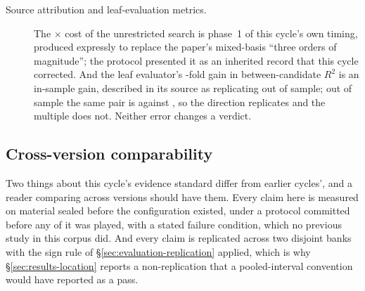\begin{description}
\item[Source attribution and leaf-evaluation metrics.] The
  \vsevenPhaseOneCost$\times$ cost of the unrestricted search is phase~1 of this cycle's own timing,
  produced expressly to replace the \vsix{} paper's mixed-basis ``three orders of magnitude''; the
  protocol presented it as an inherited record that this cycle corrected. And the leaf evaluator's \vsevenKoneFold-fold gain in between-candidate
  $R^2$ is an in-sample gain, described in its source as replicating out of sample; out of sample the
  same pair is \vsevenKoneRsqOosBefore{} against \vsevenKoneRsqOosAfter{}, so the direction
  replicates and the multiple does not. Neither error changes a verdict.

\end{description}

\subsection{Cross-version comparability}
\label{app:corrections-comparability}

Two things about this cycle's evidence standard differ from earlier cycles', and a reader comparing
across versions should have them. Every claim here is measured on material sealed before the
configuration existed, under a protocol committed before any of it was played, with a stated
failure condition, which no previous study in this corpus did. And every claim is replicated across
two disjoint banks with the sign rule of \S\ref{sec:evaluation-replication} applied, which is why
\S\ref{sec:results-location} reports a non-replication that a pooled-interval convention would have
reported as a pass.
